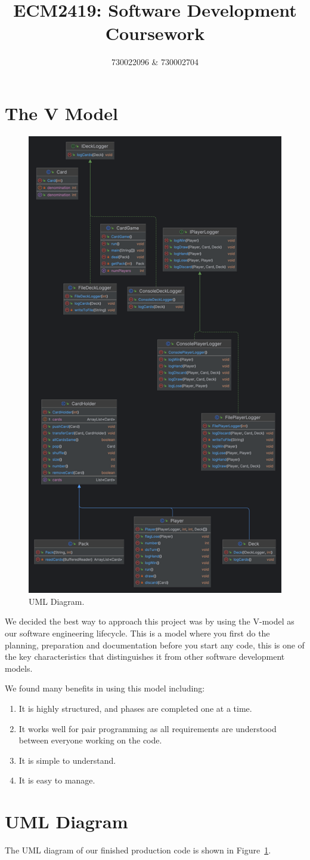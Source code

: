 \documentclass{article}
\title{ECM2419: Software Development Coursework}
\author{730022096 \& 730002704}
\date{}
\begin{document}
\maketitle

\section{The V Model}
\begin{figure}
    \centering
    \includegraphics[width=.38\textwidth]{uml}
    \caption{UML Diagram.}
    \label{fig:uml}
\end{figure}

We decided the best way to approach this project was by using the V-model as our software engineering lifecycle.
This is a model where you first do the planning, preparation and documentation before you start any code, this is one of the key characteristics that distinguishes it from other software development models.

We found many benefits in using this model including:
\begin{enumerate}
    \item It is highly structured, and phases are completed one at a time.
    \item It works well for pair programming as all requirements are understood between everyone working on the code.
    \item It is simple to understand.
    \item It is easy to manage.
\end{enumerate}

\section{UML Diagram}
The UML diagram of our finished production code is shown in Figure~\ref{fig:uml}.
\end{document}
